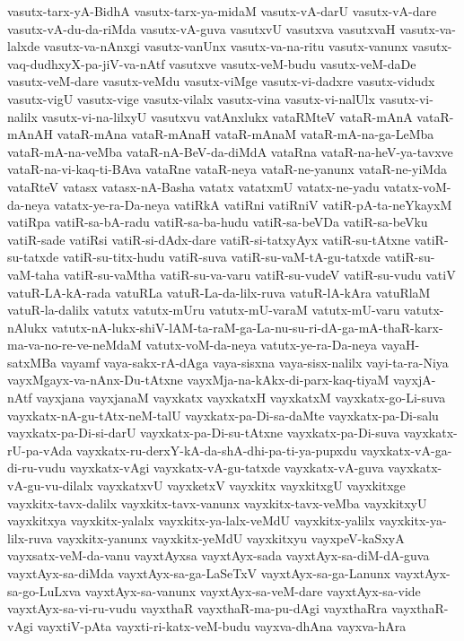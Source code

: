 {vasutx-tarx-yA-BidhA
vasutx-tarx-ya-midaM
vasutx-vA-darU
vasutx-vA-dare
vasutx-vA-du-da-riMda
vasutx-vA-guva
vasutxvU
vasutxva
vasutxvaH
vasutx-va-lalxde
vasutx-va-nAnxgi
vasutx-vanUnx
vasutx-va-na-ritu
vasutx-vanunx
vasutx-vaq-dudhxyX-pa-jiV-va-nAtf
vasutxve
vasutx-veM-budu
vasutx-veM-daDe
vasutx-veM-dare
vasutx-veMdu
vasutx-viMge
vasutx-vi-dadxre
vasutx-vidudx
vasutx-vigU
vasutx-vige
vasutx-vilalx
vasutx-vina
vasutx-vi-nalUlx
vasutx-vi-nalilx
vasutx-vi-na-lilxyU
vasutxvu
vatAnxlukx
vataRMteV
vataR-mAnA
vataR-mAnAH
vataR-mAna
vataR-mAnaH
vataR-mAnaM
vataR-mA-na-ga-LeMba
vataR-mA-na-veMba
vataR-nA-BeV-da-diMdA
vataRna
vataR-na-heV-ya-tavxve
vataR-na-vi-kaq-ti-BAva
vataRne
vataR-neya
vataR-ne-yanunx
vataR-ne-yiMda
vataRteV
vatasx
vatasx-nA-Basha
vatatx
vatatxmU
vatatx-ne-yadu
vatatx-voM-da-neya
vatatx-ye-ra-Da-neya
vatiRkA
vatiRni
vatiRniV
vatiR-pA-ta-neYkayxM
vatiRpa
vatiR-sa-bA-radu
vatiR-sa-ba-hudu
vatiR-sa-beVDa
vatiR-sa-beVku
vatiR-sade
vatiRsi
vatiR-si-dAdx-dare
vatiR-si-tatxyAyx
vatiR-su-tAtxne
vatiR-su-tatxde
vatiR-su-titx-hudu
vatiR-suva
vatiR-su-vaM-tA-gu-tatxde
vatiR-su-vaM-taha
vatiR-su-vaMtha
vatiR-su-va-varu
vatiR-su-vudeV
vatiR-su-vudu
vatiV
vatuR-LA-kA-rada
vatuRLa
vatuR-La-da-lilx-ruva
vatuR-lA-kAra
vatuRlaM
vatuR-la-dalilx
vatutx
vatutx-mUru
vatutx-mU-varaM
vatutx-mU-varu
vatutx-nAlukx
vatutx-nA-lukx-shiV-lAM-ta-raM-ga-La-nu-su-ri-dA-ga-mA-thaR-karx-ma-va-no-re-ve-neMdaM
vatutx-voM-da-neya
vatutx-ye-ra-Da-neya
vayaH-satxMBa
vayamf
vaya-sakx-rA-dAga
vaya-sisxna
vaya-sisx-nalilx
vayi-ta-ra-Niya
vayxMgayx-va-nAnx-Du-tAtxne
vayxMja-na-kAkx-di-parx-kaq-tiyaM
vayxjA-nAtf
vayxjana
vayxjanaM
vayxkatx
vayxkatxH
vayxkatxM
vayxkatx-go-Li-suva
vayxkatx-nA-gu-tAtx-neM-talU
vayxkatx-pa-Di-sa-daMte
vayxkatx-pa-Di-salu
vayxkatx-pa-Di-si-darU
vayxkatx-pa-Di-su-tAtxne
vayxkatx-pa-Di-suva
vayxkatx-rU-pa-vAda
vayxkatx-ru-derxY-kA-da-shA-dhi-pa-ti-ya-pupxdu
vayxkatx-vA-ga-di-ru-vudu
vayxkatx-vAgi
vayxkatx-vA-gu-tatxde
vayxkatx-vA-guva
vayxkatx-vA-gu-vu-dilalx
vayxkatxvU
vayxketxV
vayxkitx
vayxkitxgU
vayxkitxge
vayxkitx-tavx-dalilx
vayxkitx-tavx-vanunx
vayxkitx-tavx-veMba
vayxkitxyU
vayxkitxya
vayxkitx-yalalx
vayxkitx-ya-lalx-veMdU
vayxkitx-yalilx
vayxkitx-ya-lilx-ruva
vayxkitx-yanunx
vayxkitx-yeMdU
vayxkitxyu
vayxpeV-kaSxyA
vayxsatx-veM-da-vanu
vayxtAyxsa
vayxtAyx-sada
vayxtAyx-sa-diM-dA-guva
vayxtAyx-sa-diMda
vayxtAyx-sa-ga-LaSeTxV
vayxtAyx-sa-ga-Lanunx
vayxtAyx-sa-go-LuLxva
vayxtAyx-sa-vanunx
vayxtAyx-sa-veM-dare
vayxtAyx-sa-vide
vayxtAyx-sa-vi-ru-vudu
vayxthaR
vayxthaR-ma-pu-dAgi
vayxthaRra
vayxthaR-vAgi
vayxtiV-pAta
vayxti-ri-katx-veM-budu
vayxva-dhAna
vayxva-hAra
}
